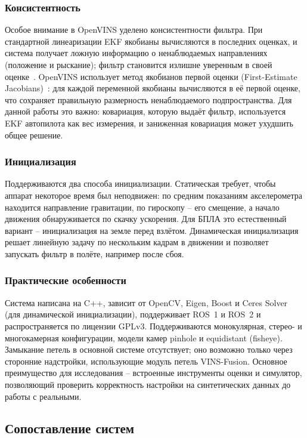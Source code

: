     \subsubsection{Консистентность}
    Особое внимание в OpenVINS уделено консистентности фильтра.
    При стандартной линеаризации EKF якобианы вычисляются в последних оценках, и система получает ложную информацию о ненаблюдаемых направлениях (положение и рыскание); фильтр становится излишне уверенным в своей оценке~\cite{vins_consistency}.
    OpenVINS использует метод якобианов первой оценки (First-Estimate Jacobians)~\cite{fej}: для каждой переменной якобианы вычисляются в её первой оценке, что сохраняет правильную размерность ненаблюдаемого подпространства.
    Для данной работы это важно: ковариация, которую выдаёт фильтр, используется EKF автопилота как вес измерения, и заниженная ковариация может ухудшить общее решение.

    \subsubsection{Инициализация}
    Поддерживаются два способа инициализации.
    Статическая требует, чтобы аппарат некоторое время был неподвижен: по средним показаниям акселерометра находится направление гравитации, по гироскопу -- его смещение, а начало движения обнаруживается по скачку ускорения.
    Для БПЛА это естественный вариант -- инициализация на земле перед взлётом.
    Динамическая инициализация решает линейную задачу по нескольким кадрам в движении и позволяет запускать фильтр в полёте, например после сбоя.

    \subsubsection{Практические особенности}
    Система написана на C++, зависит от OpenCV, Eigen, Boost и Ceres Solver (для динамической инициализации), поддерживает ROS~1 и ROS~2 и распространяется по лицензии GPLv3.
    Поддерживаются монокулярная, стерео- и многокамерная конфигурации, модели камер pinhole и equidistant (fisheye).
    Замыкание петель в основной системе отсутствует; оно возможно только через сторонние надстройки, использующие модуль петель VINS-Fusion.
    Основное преимущество для исследования -- встроенные инструменты оценки и симулятор, позволяющий проверить корректность настройки на синтетических данных до работы с реальными.

    \subsection{Сопоставление систем}

